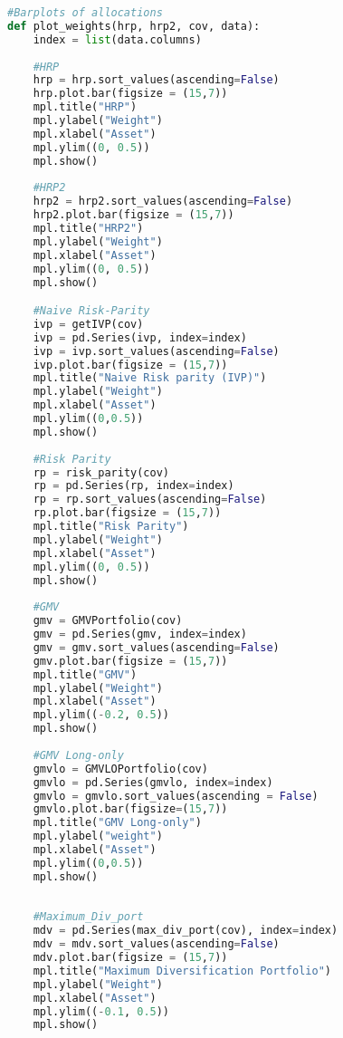 \begin{lstlisting}[language=Python]
#Barplots of allocations
def plot_weights(hrp, hrp2, cov, data):
    index = list(data.columns)
    
    #HRP
    hrp = hrp.sort_values(ascending=False)
    hrp.plot.bar(figsize = (15,7))
    mpl.title("HRP")
    mpl.ylabel("Weight")
    mpl.xlabel("Asset")
    mpl.ylim((0, 0.5))
    mpl.show()
    
    #HRP2
    hrp2 = hrp2.sort_values(ascending=False)
    hrp2.plot.bar(figsize = (15,7))
    mpl.title("HRP2")
    mpl.ylabel("Weight")
    mpl.xlabel("Asset")
    mpl.ylim((0, 0.5))
    mpl.show()

    #Naive Risk-Parity
    ivp = getIVP(cov)
    ivp = pd.Series(ivp, index=index)
    ivp = ivp.sort_values(ascending=False)
    ivp.plot.bar(figsize = (15,7))
    mpl.title("Naive Risk parity (IVP)")
    mpl.ylabel("Weight")
    mpl.xlabel("Asset")
    mpl.ylim((0,0.5))
    mpl.show()
    
    #Risk Parity
    rp = risk_parity(cov)
    rp = pd.Series(rp, index=index)
    rp = rp.sort_values(ascending=False)
    rp.plot.bar(figsize = (15,7))
    mpl.title("Risk Parity")
    mpl.ylabel("Weight")
    mpl.xlabel("Asset")
    mpl.ylim((0, 0.5))
    mpl.show()
    
    #GMV
    gmv = GMVPortfolio(cov)
    gmv = pd.Series(gmv, index=index)
    gmv = gmv.sort_values(ascending=False)
    gmv.plot.bar(figsize = (15,7))
    mpl.title("GMV")
    mpl.ylabel("Weight")
    mpl.xlabel("Asset")
    mpl.ylim((-0.2, 0.5))
    mpl.show()
    
    #GMV Long-only
    gmvlo = GMVLOPortfolio(cov)
    gmvlo = pd.Series(gmvlo, index=index)
    gmvlo = gmvlo.sort_values(ascending = False)
    gmvlo.plot.bar(figsize=(15,7))
    mpl.title("GMV Long-only")
    mpl.ylabel("weight")
    mpl.xlabel("Asset")
    mpl.ylim((0,0.5))
    mpl.show()
    
    
    #Maximum_Div_port
    mdv = pd.Series(max_div_port(cov), index=index)
    mdv = mdv.sort_values(ascending=False)
    mdv.plot.bar(figsize = (15,7))
    mpl.title("Maximum Diversification Portfolio")
    mpl.ylabel("Weight")
    mpl.xlabel("Asset")
    mpl.ylim((-0.1, 0.5))
    mpl.show()
\end{lstlisting}

